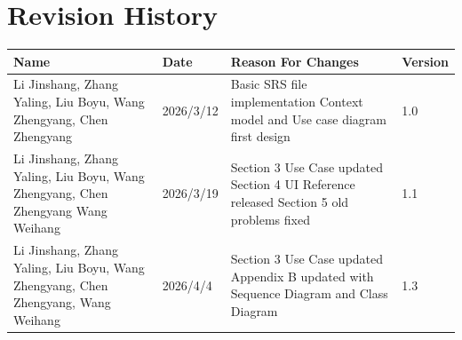 \section*{Revision History}

\begin{longtable}{|p{3.5cm}|p{2cm}|p{6cm}|p{2cm}|}
\hline
\textbf{Name} & \textbf{Date} & \textbf{Reason For Changes} & \textbf{Version} \\
\hline
Li Jinshang,\newline
Zhang Yaling,\newline
Liu Boyu,\newline
Wang Zhengyang,\newline
Chen Zhengyang
&
2026/3/12
&
Basic SRS file implementation\newline
Context model and Use case diagram first design
&
1.0 \\
\hline
Li Jinshang,\newline
Zhang Yaling,\newline
Liu Boyu,\newline
Wang Zhengyang,\newline
Chen Zhengyang\newline
Wang Weihang
&
2026/3/19
&
Section 3 Use Case updated\newline
Section 4 UI Reference released\newline
Section 5 old problems fixed
&
1.1 \\
\hline
Li Jinshang,\newline
Zhang Yaling,\newline
Liu Boyu,\newline
Wang Zhengyang,\newline
Chen Zhengyang,\newline
Wang Weihang
&
2026/4/4
&
Section 3 Use Case updated\newline
Appendix B updated with Sequence Diagram and Class Diagram
&
1.3 \\
\hline
\end{longtable}
